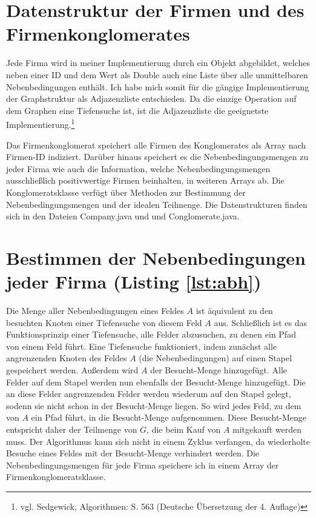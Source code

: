 \section{Datenstruktur der Firmen und des Firmenkonglomerates}
Jede Firma wird in meiner Implementierung durch ein Objekt abgebildet, welches neben einer ID und dem Wert als Double auch eine Liste über alle unmittelbaren Nebenbedingungen enthält. Ich habe mich somit für die gängige Implementierung der Graphstruktur als Adjazenzliste entschieden. Da die einzige Operation auf dem Graphen eine Tiefensuche ist, ist die Adjazenzliste die geeignetste Implementierung.\footnote{vgl. Sedgewick, Algorithmen: S. 563 (Deutsche Übersetzung der 4. Auflage)}

Das Firmenkonglomerat speichert alle Firmen des Konglomerates als Array nach Firmen-ID indiziert. Darüber hinaus speichert es die Nebenbedingungsmengen zu jeder Firma wie auch die Information, welche Nebenbedingungsmengen ausschließlich positivwertige Firmen beinhalten, in weiteren Arrays ab. Die Konglomeratsklasse verfügt über Methoden zur Bestimmung der Nebenbedingungsmengen und der idealen Teilmenge. Die Datenstrukturen finden sich in den Dateien Company.java und und Conglomerate.java.

\section{Bestimmen der Nebenbedingungen jeder Firma (Listing \ref{lst:abh})}
Die Menge aller Nebenbedingungen eines Feldes \(A\) ist äquivalent zu den besuchten Knoten einer Tiefensuche von diesem Feld \(A\) aus. Schließlich ist es das Funktionsprinzip einer Tiefensuche, alle Felder abzusuchen, zu denen ein Pfad von einem Feld führt. Eine Tiefensuche funktioniert, indem zunächst alle angrenzenden Knoten des Feldes \(A\) (die Nebenbedingungen) auf einen Stapel gespeichert werden.
Außerdem wird \(A\) der Besucht-Menge hinzugefügt. Alle Felder auf dem Stapel werden nun ebenfalls der Besucht-Menge hinzugefügt. Die an diese Felder angrenzenden Felder werden wiederum auf den Stapel gelegt, sodenn sie nicht schon in der Besucht-Menge liegen. So wird jedes Feld, zu dem von \(A\) ein Pfad führt, in die Besucht-Menge aufgenommen. Diese Besucht-Menge entspricht daher der Teilmenge von \(G\), die beim Kauf von \(A\) mitgekauft werden muss. Der Algorithmus kann sich nicht in einem Zyklus verfangen, da wiederholte Besuche eines Feldes mit der Besucht-Menge verhindert werden. Die Nebenbedingungsmengen für jede Firma speichere ich in einem Array der Firmenkonglomeratsklasse.

